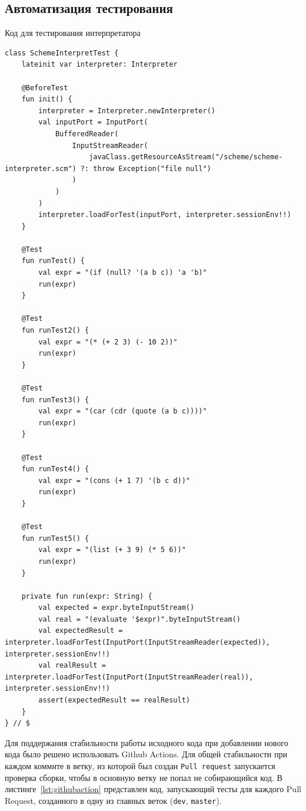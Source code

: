 \documentclass[14pt, russian]{scrartcl}
\newenvironment{longlisting}{\captionsetup{type=listing}}{}
\begin{document}
\begin{longlisting}

\subsection{Автоматизация тестирования}
\caption{Код для тестирования интерпретатора}
\label{lst:testrun}
\begin{verbatim}
class SchemeInterpretTest {
    lateinit var interpreter: Interpreter

    @BeforeTest
    fun init() {
        interpreter = Interpreter.newInterpreter()
        val inputPort = InputPort(
            BufferedReader(
                InputStreamReader(
                    javaClass.getResourceAsStream("/scheme/scheme-interpreter.scm") ?: throw Exception("file null")
                )
            )
        )
        interpreter.loadForTest(inputPort, interpreter.sessionEnv!!)
    }

    @Test
    fun runTest() {
        val expr = "(if (null? '(a b c)) 'a 'b)"
        run(expr)
    }

    @Test
    fun runTest2() {
        val expr = "(* (+ 2 3) (- 10 2))"
        run(expr)
    }

    @Test
    fun runTest3() {
        val expr = "(car (cdr (quote (a b c))))"
        run(expr)
    }

    @Test
    fun runTest4() {
        val expr = "(cons (+ 1 7) '(b c d))"
        run(expr)
    }

    @Test
    fun runTest5() {
        val expr = "(list (+ 3 9) (* 5 6))"
        run(expr)
    }

    private fun run(expr: String) {
        val expected = expr.byteInputStream()
        val real = "(evaluate '$expr)".byteInputStream()
        val expectedResult = interpreter.loadForTest(InputPort(InputStreamReader(expected)), interpreter.sessionEnv!!)
        val realResult = interpreter.loadForTest(InputPort(InputStreamReader(real)), interpreter.sessionEnv!!)
        assert(expectedResult == realResult)
    }
} // $
\end{verbatim}
\end{longlisting}

Для поддержания стабильности работы исходного кода при добавлении нового кода было решено использовать Github Actions. Для общей стабильности при каждом коммите в ветку, из которой был создан \texttt{Pull request} запускается проверка сборки, чтобы в основную ветку не попал не собирающийся код. В листинге~\ref{lst:githubaction} представлен код, запускающий тесты для каждого Pull Request, созданного в одну из главных веток (\texttt{dev}, \texttt{master}).
\end{document}
